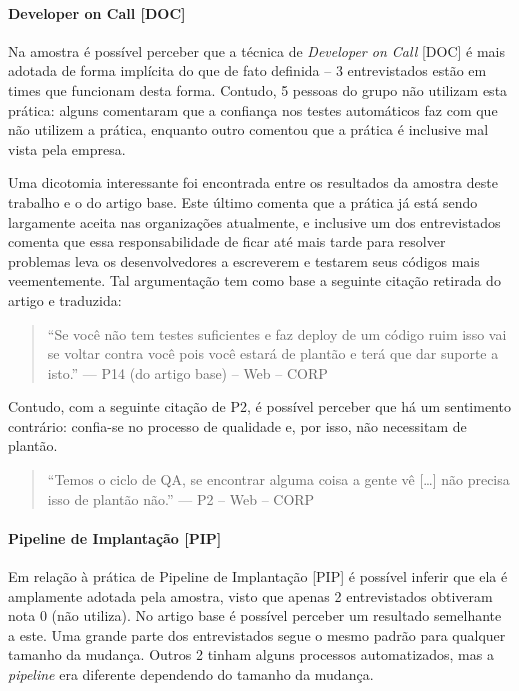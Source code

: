 \paragraph{Developer on Call [DOC]}

Na amostra é possível perceber que a técnica de \emph{Developer on Call} [DOC] \cite{devAndDeploymentFB} é mais adotada de forma implícita do que de fato definida -- 3 entrevistados estão em times que funcionam desta forma. Contudo, 5 pessoas do grupo não utilizam esta prática: alguns comentaram que a confiança nos testes automáticos faz com que não utilizem a prática, enquanto outro comentou que a prática é inclusive mal vista pela empresa.

Uma dicotomia interessante foi encontrada entre os resultados da amostra deste trabalho e o do artigo base. Este último comenta que a prática já está sendo largamente aceita nas organizações atualmente, e inclusive um dos entrevistados comenta que essa responsabilidade de ficar até mais tarde para resolver problemas leva os desenvolvedores a escreverem e testarem seus códigos mais veementemente. Tal argumentação tem como base a seguinte citação retirada do artigo e traduzida:

\begin{quote}
    ``Se você não tem testes suficientes e faz deploy de um código ruim isso vai se voltar contra você pois você estará de plantão e terá que dar suporte a isto.'' --- P14 (do artigo base) -- Web -- CORP
\end{quote}


Contudo, com a seguinte citação de P2, é possível perceber que há um sentimento contrário: confia-se no processo de qualidade e, por isso, não necessitam de plantão.


\begin{quote}
    ``Temos o ciclo de QA, se encontrar alguma coisa a gente vê […] não precisa isso de plantão não.'' --- P2 -- Web -- CORP
\end{quote}

\paragraph{Pipeline de Implantação [PIP]}

Em relação à prática de Pipeline de Implantação [PIP] \cite{devopsBook} é possível inferir que ela é amplamente adotada pela amostra, visto que apenas 2 entrevistados obtiveram nota 0 (não utiliza). No artigo base é possível perceber um resultado semelhante a este. Uma grande parte dos entrevistados segue o mesmo padrão para qualquer tamanho da mudança. Outros 2 tinham alguns processos automatizados, mas a \emph{pipeline} era diferente dependendo do tamanho da mudança.

